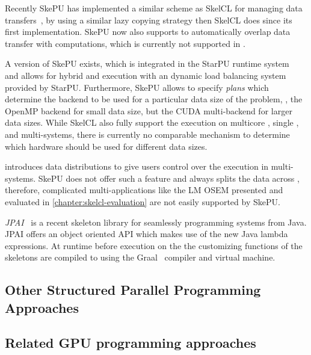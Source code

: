 Recently SkePU has implemented a similar scheme as SkelCL for managing data transfers~\cite{DastgeerKe14}, by using a similar lazy copying strategy then SkelCL does since its first implementation.
SkePU now also supports to automatically overlap data transfer with computations, which is currently not supported in \SkelCL.

A version of SkePU exists, which is integrated in the StarPU runtime system~\cite{AugonnetTNW09} and allows for hybrid \CPU and \GPU execution with an dynamic load balancing system provided by StarPU.
Furthermore, SkePU allows to specify \emph{plans} which determine the backend to be used for a particular data size of the problem, \eg, the OpenMP backend for small data size, but the CUDA multi-\GPU backend for larger data sizes.
While SkelCL also fully support the execution on multicore \CPUs, single \GPUs, and  multi-\GPU systems, there is currently no comparable mechanism to determine which hardware should be used for different data sizes.

\SkelCL introduces data distributions to give users control over the execution in multi-\GPU systems.
SkePU does not offer such a feature and always splits the data across \GPUs, therefore, complicated multi-\GPU applications like the LM OSEM presented and evaluated in \autoref{chapter:skelcl-evaluation} are not easily supported by SkePU.

\bigskip

\emph{JPAI}~\cite{FumeroStDu2014} is a recent skeleton library for seamlessly programming \GPU systems from Java.
JPAI offers an object oriented API which makes use of the new Java lambda expressions.
At runtime before execution on the \GPU the customizing functions of the skeletons are compiled to \OpenCL using the Graal~\cite{DuboscqStWuSiWiMo2013} compiler and virtual machine.


\subsection{Other Structured Parallel Programming Approaches}




\subsection{Related GPU programming approaches}

